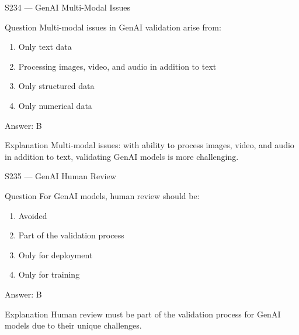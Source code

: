 \documentclass[aspectratio=169,8pt]{beamer}
\begin{document}
\begin{frame}{S234 --- GenAI Multi-Modal Issues}
	\begin{block}{Question}
		Multi-modal issues in GenAI validation arise from:
		\begin{enumerate}
			\item Only text data
			\item Processing images, video, and audio in addition to text
			\item Only structured data
			\item Only numerical data
		\end{enumerate}
	\end{block}
	\begin{exampleblock}{Answer: B}\end{exampleblock}
	\begin{block}{Explanation}
		Multi-modal issues: with ability to process images, video, and audio in addition to text, validating GenAI models is more challenging.
	\end{block}
\end{frame}

\begin{frame}{S235 --- GenAI Human Review}
	\begin{block}{Question}
		For GenAI models, human review should be:
		\begin{enumerate}
			\item Avoided
			\item Part of the validation process
			\item Only for deployment
			\item Only for training
		\end{enumerate}
	\end{block}
	\begin{exampleblock}{Answer: B}\end{exampleblock}
	\begin{block}{Explanation}
		Human review must be part of the validation process for GenAI models due to their unique challenges.
	\end{block}
\end{frame}
\end{document}
